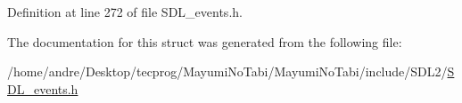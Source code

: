 Definition at line 272 of file S\-D\-L\-\_\-events.\-h.



The documentation for this struct was generated from the following file\-:\begin{DoxyCompactItemize}
\item 
/home/andre/\-Desktop/tecprog/\-Mayumi\-No\-Tabi/\-Mayumi\-No\-Tabi/include/\-S\-D\-L2/\hyperlink{_s_d_l__events_8h}{S\-D\-L\-\_\-events.\-h}\end{DoxyCompactItemize}

